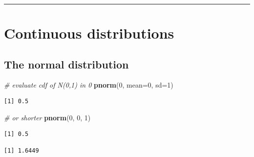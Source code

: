 \documentclass[
]{book}
\newenvironment{Shaded}{\begin{snugshade}}{\end{snugshade}}
\newcommand{\CommentTok}[1]{\textcolor[rgb]{0.56,0.35,0.01}{\textit{#1}}}
\newcommand{\DataTypeTok}[1]{\textcolor[rgb]{0.13,0.29,0.53}{#1}}
\newcommand{\DecValTok}[1]{\textcolor[rgb]{0.00,0.00,0.81}{#1}}
\newcommand{\FloatTok}[1]{\textcolor[rgb]{0.00,0.00,0.81}{#1}}
\newcommand{\KeywordTok}[1]{\textcolor[rgb]{0.13,0.29,0.53}{\textbf{#1}}}
\newcommand{\NormalTok}[1]{#1}
\begin{document}
\begin{center}\rule{0.5\linewidth}{0.5pt}\end{center}

\hypertarget{continuous-distributions}{%
\section{Continuous distributions}\label{continuous-distributions}}

\hypertarget{the-normal-distribution}{%
\subsection{The normal distribution}\label{the-normal-distribution}}

\begin{Shaded}
\begin{Highlighting}[]
\CommentTok{# evaluate cdf of N(0,1) in 0}
\KeywordTok{pnorm}\NormalTok{(}\DecValTok{0}\NormalTok{, }\DataTypeTok{mean=}\DecValTok{0}\NormalTok{, }\DataTypeTok{sd=}\DecValTok{1}\NormalTok{)}
\end{Highlighting}
\end{Shaded}

\begin{verbatim}
[1] 0.5
\end{verbatim}

\begin{Shaded}
\begin{Highlighting}[]
\CommentTok{# or shorter}
\KeywordTok{pnorm}\NormalTok{(}\DecValTok{0}\NormalTok{, }\DecValTok{0}\NormalTok{, }\DecValTok{1}\NormalTok{)}
\end{Highlighting}
\end{Shaded}

\begin{verbatim}
[1] 0.5
\end{verbatim}

\begin{Shaded}
\end{Shaded}

\begin{verbatim}
[1] 1.6449
\end{verbatim}
\end{document}
